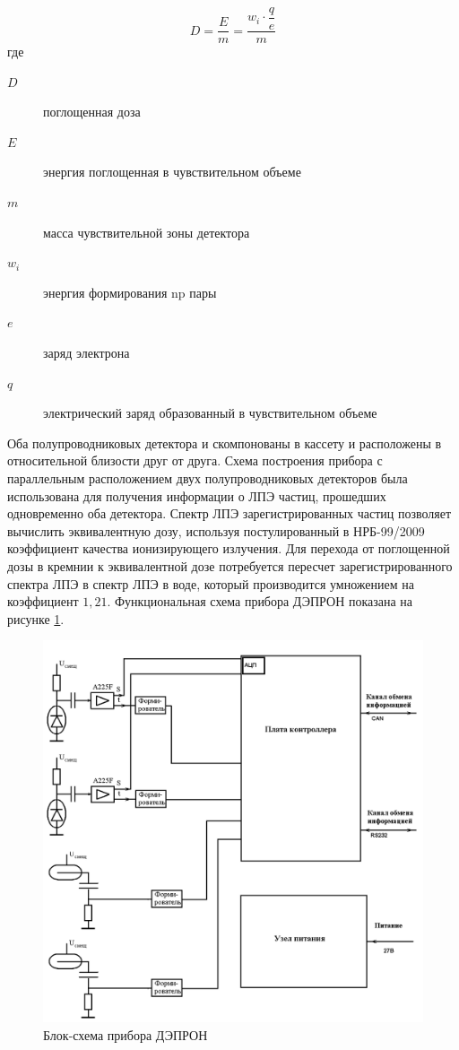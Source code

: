 \begin{equation}\label{eq:benghin_doze}
D = \frac{E}{m} = \dfrac{w_i \cdot\dfrac{q}{e}}{m}
\end{equation}
где \begin{description}
	\item[$ D $] поглощенная доза
	\item[$ E $] энергия поглощенная в чувствительном объеме
	\item[$ m $] масса чувствительной зоны детектора
	\item[$ w_i $] энергия формирования np пары
	\item[$ e $] заряд электрона
	\item[$ q $] электрический заряд образованный в чувствительном объеме
\end{description}
Оба полупроводниковых детектора и скомпонованы в кассету и расположены в относительной близости друг от друга. Схема построения прибора с параллельным расположением двух полупроводниковых детекторов была использована для получения информации о ЛПЭ частиц, прошедших одновременно оба детектора. Спектр ЛПЭ зарегистрированных частиц позволяет вычислить эквивалентную дозу, используя постулированный в НРБ-99/2009 \cite{nrb2009} коэффициент качества ионизирующего излучения. Для перехода от поглощенной дозы в кремнии к эквивалентной дозе потребуется пересчет зарегистрированного спектра ЛПЭ в спектр ЛПЭ в воде, который производится умножением на коэффициент $1,21$.
 Функциональная схема прибора ДЭПРОН показана на рисунке \ref{fig:Depron_blocksch}.
 
\begin{figure}
\centering
\includegraphics[width=0.8\linewidth]{images/Depron_blocksch}
\caption{Блок-схема прибора ДЭПРОН}
\label{fig:Depron_blocksch}
\end{figure}


